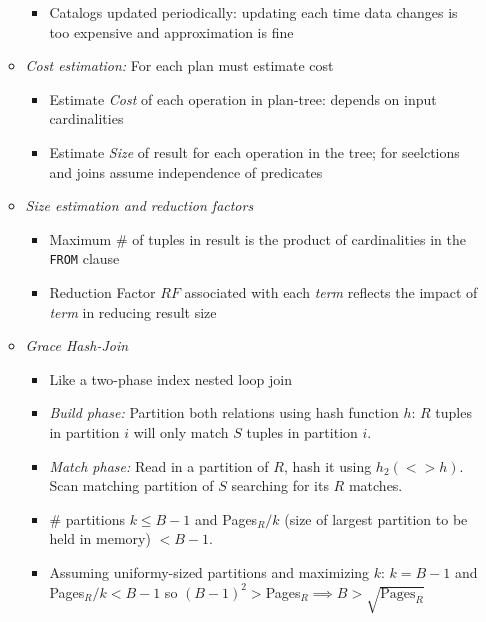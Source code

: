 \documentclass[landscape,8pt]{extarticle}
\newcommand{\code}{\lstinline}
\begin{document}
\begin{multicols}{5}
\begin{itemize}
\begin{itemize}
\begin{itemize}
                            \item Catalogs updated periodically: updating each time data changes is too expensive and approximation is fine
                        \end{itemize}
                  \item \emph{Cost estimation:} For each plan must estimate cost
                        \begin{itemize}
                            \item Estimate \emph{Cost} of each operation in plan-tree: depends on input cardinalities
                            \item Estimate \emph{Size} of result for each operation in the tree; for seelctions and joins assume independence of predicates
                        \end{itemize}
                  \item \emph{Size estimation and reduction factors}
                        \begin{itemize}
                            \item Maximum \# of tuples in result is the product of cardinalities in the \code{FROM} clause
                            \item Reduction Factor $RF$ associated with each \emph{term} reflects the impact of \emph{term} in reducing result size
                        \end{itemize}
                  \item \emph{Grace Hash-Join}
                        \begin{itemize}
                            \item Like a two-phase index nested loop join
                            \item \emph{Build phase:} Partition both relations using hash function $h$: $R$ tuples in partition $i$ will only match $S$ tuples in partition $i$.
                            \item \emph{Match phase:} Read in a partition of $R$, hash it using $h_2 (<>h)$. Scan matching partition of $S$ searching for its $R$ matches.
                            \item \# partitions $k \leq B-1$ and Pages$_R /k$ (size of largest partition to be held in memory) $< B-1$.
                            \item Assuming uniformy-sized partitions and maximizing $k$: $k = B-1$ and Pages$_R /k < B-1$ so $(B-1)^2 > $Pages$_R \implies B > \sqrt{\text{Pages}_R}$

\end{itemize}
\end{itemize}
\end{itemize}
\end{multicols}
\end{document}
